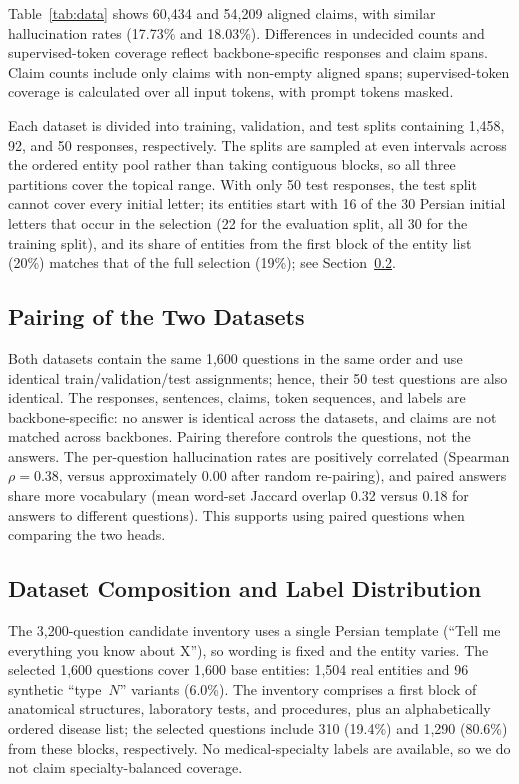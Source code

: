 \documentclass[conference,a4paper]{IEEEtran}
\begin{document}
Table~\ref{tab:data} shows 60,434 and 54,209 aligned claims, with similar hallucination rates (17.73\% and 18.03\%). Differences in undecided counts and supervised-token coverage reflect backbone-specific responses and claim spans. Claim counts include only claims with non-empty aligned spans; supervised-token coverage is calculated over all input tokens, with prompt tokens masked.

Each dataset is divided into training, validation, and test splits containing 1,458, 92, and 50 responses, respectively. The splits are sampled at even intervals across the ordered entity pool rather than taking contiguous blocks, so all three partitions cover the topical range. With only 50 test responses, the test split cannot cover every initial letter; its entities start with 16 of the 30 Persian initial letters that occur in the selection (22 for the evaluation split, all 30 for the training split), and its share of entities from the first block of the entity list (20\%) matches that of the full selection (19\%); see Section~\ref{sec:stats}.

\subsection{Pairing of the Two Datasets}
\label{sec:pairing}
Both datasets contain the same 1,600 questions in the same order and use identical train/validation/test assignments; hence, their 50 test questions are also identical. The responses, sentences, claims, token sequences, and labels are backbone-specific: no answer is identical across the datasets, and claims are not matched across backbones. Pairing therefore controls the questions, not the answers. The per-question hallucination rates are positively correlated (Spearman $\rho=0.38$, versus approximately 0.00 after random re-pairing), and paired answers share more vocabulary (mean word-set Jaccard overlap 0.32 versus 0.18 for answers to different questions). This supports using paired questions when comparing the two heads.

\subsection{Dataset Composition and Label Distribution}
\label{sec:stats}
The 3,200-question candidate inventory uses a single Persian template (``Tell me everything you know about X''), so wording is fixed and the entity varies. The selected 1,600 questions cover 1,600 base entities: 1,504 real entities and 96 synthetic ``type~$N$'' variants (6.0\%). The inventory comprises a first block of anatomical structures, laboratory tests, and procedures, plus an alphabetically ordered disease list; the selected questions include 310 (19.4\%) and 1,290 (80.6\%) from these blocks, respectively. No medical-specialty labels are available, so we do not claim specialty-balanced coverage. %
\end{document}
